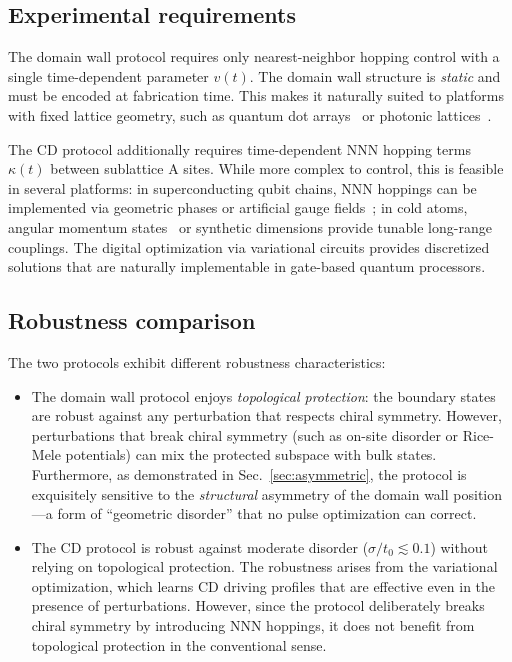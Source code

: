 \documentclass[
  reprint,
  amsmath,
  amssymb,
  aps,
  prb,
  floatfix,
  longbibliography,
]{revtex4-2}
\begin{document}
\subsection{Experimental requirements}
\label{sec:comp_experimental}

The domain wall protocol requires only nearest-neighbor hopping control
with a single time-dependent parameter $v(t)$. The domain wall structure
is \emph{static} and must be encoded at fabrication time. This makes it
naturally suited to platforms with fixed lattice geometry, such as quantum
dot arrays~\cite{Mei2018} or photonic lattices~\cite{Meier2016}.

The CD protocol additionally requires time-dependent NNN hopping terms
$\kappa(t)$ between sublattice A sites. While more complex to control,
this is feasible in several platforms: in superconducting qubit chains,
NNN hoppings can be implemented via geometric phases or artificial gauge
fields~\cite{Romero2024}; in cold atoms, angular momentum
states~\cite{Romero2024} or synthetic dimensions provide tunable long-range
couplings. The digital optimization via variational circuits provides
discretized solutions that are naturally implementable in gate-based quantum
processors.

\subsection{Robustness comparison}
\label{sec:comp_robustness}

The two protocols exhibit different robustness characteristics:

\begin{itemize}
  \item The domain wall protocol enjoys \emph{topological protection}: the
    boundary states are robust against any perturbation that respects chiral
    symmetry. However, perturbations that break chiral symmetry (such as
    on-site disorder or Rice-Mele potentials) can mix the protected subspace
    with bulk states. Furthermore, as demonstrated in Sec.~\ref{sec:asymmetric},
    the protocol is exquisitely sensitive to the \emph{structural}
    asymmetry of the domain wall position---a form of ``geometric disorder''
    that no pulse optimization can correct.
  \item The CD protocol is robust against moderate disorder
    ($\sigma/t_0 \lesssim 0.1$) without relying on topological protection.
    The robustness arises from the variational optimization, which learns
    CD driving profiles that are effective even in the presence of perturbations.
    However, since the protocol deliberately breaks chiral symmetry by
    introducing NNN hoppings, it does not benefit from topological protection
    in the conventional sense.
\end{itemize}
\end{document}
